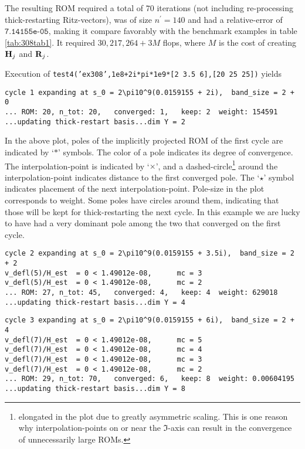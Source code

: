 The resulting ROM required a total of $70$ iterations (not including re-processing thick-restarting Ritz-vectors), was of size  $n^\prime=140$ and had a relative-error of $\texttt{7.14155e-05}$, making it compare favorably with the benchmark examples in table \ref{tab:308tab1}.   It required $30,217,264 + 3M$ flops, where $M$ is the cost of creating $\textbf{\textup{H}}_j$ and $\textbf{\textup{R}}_j$.   

Execution of  \texttt{test4('ex308',1e8+2i*pi*1e9*[2 3.5 6],[20 25 25])} yields

{\singlespacing
\begin{verbatim}
cycle 1 expanding at s_0 = 2\pi10^9(0.0159155 + 2i),  band_size = 2 + 0 
... ROM: 20, n_tot: 20,   converged: 1,   keep: 2  weight: 154591
...updating thick-restart basis...dim Y = 2 
\end{verbatim}
}

In the above plot, poles of the implicitly projected ROM of the first cycle are indicated by `$*$' symbols.  The color of a pole indicates its degree of convergence.  The interpolation-point is indicated by `$\times$', and a dashed-circle\footnote{elongated in the plot due to greatly asymmetric scaling.  This is one reason why interpolation-points on or near the $\Im$-axis can result in the convergence of unnecessarily large ROMs.} around the interpolation-point indicates distance to the first converged pole.  The `$\star$' symbol indicates placement of the next interpolation-point.    Pole-size in the plot corresponds to weight.  Some poles have circles around them, indicating that those will be kept for thick-restarting the next cycle.    In this example we are lucky to have had a very dominant pole among the two that converged on the first cycle.    



{\singlespacing
\begin{verbatim}
cycle 2 expanding at s_0 = 2\pi10^9(0.0159155 + 3.5i),  band_size = 2 + 2 
v_defl(5)/H_est  = 0 < 1.49012e-08, 	 mc = 3
v_defl(5)/H_est  = 0 < 1.49012e-08, 	 mc = 2
... ROM: 27, n_tot: 45,   converged: 4,   keep: 4  weight: 629018
...updating thick-restart basis...dim Y = 4
\end{verbatim}
}

{\singlespacing
\begin{verbatim}
cycle 3 expanding at s_0 = 2\pi10^9(0.0159155 + 6i),  band_size = 2 + 4 
v_defl(7)/H_est  = 0 < 1.49012e-08, 	 mc = 5
v_defl(7)/H_est  = 0 < 1.49012e-08, 	 mc = 4
v_defl(7)/H_est  = 0 < 1.49012e-08, 	 mc = 3
v_defl(7)/H_est  = 0 < 1.49012e-08, 	 mc = 2
... ROM: 29, n_tot: 70,   converged: 6,   keep: 8  weight: 0.00604195
...updating thick-restart basis...dim Y = 8
\end{verbatim}
}



